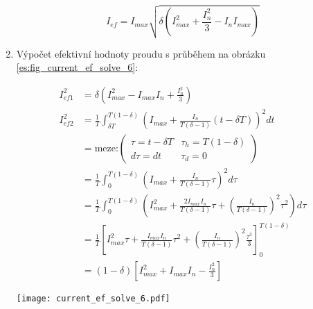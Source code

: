 \begin{enumerate}
        \begin{equation}\label{es:eq_current_ef_solve_5}
          I_{ef}=I_{max}\sqrt{\delta\left(I_{max}^2+\frac{I_n^2}{3}- I_nI_{max}\right)}
        \end{equation} 
         
      \item Výpočet efektivní hodnoty proudu s průběhem na obrázku \ref{es:fig_current_ef_solve_6}:

        \setlength{\parindent}{-10mm}
        \begin{minipage}[b]{0.6\textwidth}%
          \begin{align*}
            I_{ef1}^2 &=  \delta\left(I_{max}^2-I_{max}I_n+\frac{I_n^2}{3}\right)         \\
            I_{ef2}^2 &=  \frac{1}{T}\int_{\delta T}^{T(1-\delta)}\left(I_{max}
                         +\frac{I_n}{T(\delta-1)}(t-\delta T)\right)^2dt                  \\
                      &=  \text{meze:}\left(
                            \begin{array}{cc}
                                \tau = t -\delta T & \tau_h = T(1-\delta)  \\
                               d\tau = dt          & \tau_d = 0
                            \end{array}
                          \right) \\ \nonumber
                      &=  \frac{1}{T}\int_0^{T(1-\delta)}\left(I_{max} +
                          \frac{I_n}{T(\delta-1)}\tau\right)^2d\tau                       \\
                      &=  \frac{1}{T}\int_0^{T(1-\delta)}\left(I_{max}^2 +
                          \frac{2I_{max}I_n}{T(\delta-1)}\tau +
                          \left(\frac{I_n}{T(\delta-1)}\right)^2\tau^2\right)d\tau        \\
                      &=  \frac{1}{T}\left[I_{max}^2\tau +
                          \frac{I_{max}I_n}{T(\delta-1)}\tau^2 +
                          \left(\frac{I_n}{T(\delta-1)}\right)^2
                          \frac{\tau^3}{3}\right]_0^{T(1-\delta)}                         \\
                      &=  (1-\delta)\left[I_{max}^2+I_{max}I_n - \frac{I_n^2}{3}\right]
          \end{align*}
        \end{minipage} %
        \hspace{0.05\textwidth}
        \begin{minipage}[b]{0.3\textwidth}%
          \texttt{[image: current\_ef\_solve\_6.pdf]}
          \label{es:fig_current_ef_solve_6}
        \end{minipage}\newline
        

\end{enumerate}
